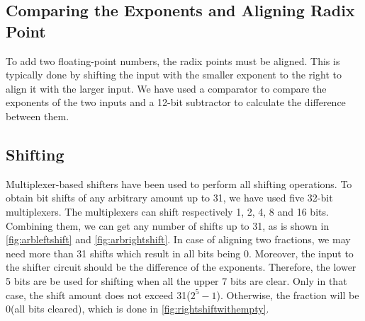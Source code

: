 \documentclass[12pt]{article}
\begin{document}
\subsection{Comparing the Exponents and Aligning Radix Point}
To add two floating-point numbers, the radix points must be aligned. This is typically done by shifting the input with the smaller exponent to the right to align it with the larger input. We have used a comparator to compare the exponents of the two inputs and a 12-bit subtractor to calculate the difference between them.

\subsection{Shifting}
Multiplexer-based shifters have been used to perform all shifting operations. To obtain bit shifts of any arbitrary amount up to 31, we have used five 32-bit multiplexers. The multiplexers can shift respectively 1, 2, 4, 8 and 16 bits. Combining them, we can get any number of shifts up to 31, as is shown in \ref{fig:arbleftshift} and \ref{fig:arbrightshift}. In case of aligning two fractions, we may need more than 31 shifts which result in all bits being 0. Moreover, the input to the shifter circuit should be the difference of the exponents. Therefore, the lower 5 bits are be used for shifting when all the upper 7 bits are clear. Only in that case, the shift amount does not exceed 31($2^{5}-1$). Otherwise, the fraction will be 0(all bits cleared), which is done in \ref{fig:rightshiftwithempty}.
\end{document}
